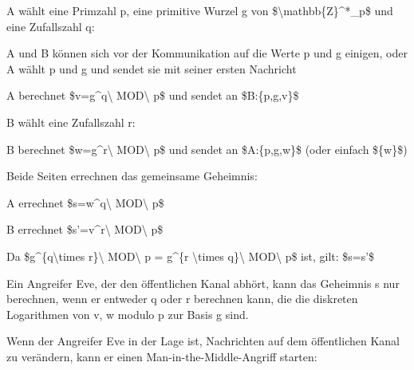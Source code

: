 \documentclass[a4paper]{article}
\begin{document}
\begin{multicols}{3}
\begin{itemize*}
            \begin{itemize*}
                  \item A wählt eine Primzahl p, eine primitive Wurzel g von \$\textbackslash mathbb\{Z\}\^{}*\_p\$ und eine Zufallszahl q:
                  \begin{itemize*} \item A und B können sich vor der Kommunikation auf die Werte p und g einigen, oder A wählt p und g und sendet sie mit seiner ersten Nachricht \item A berechnet \$v=g\^{}q\textbackslash{} MOD\textbackslash{} p\$ und sendet an \$B:\{p,g,v\}\$ \end{itemize*}
                  \item B wählt eine Zufallszahl r:
                  \begin{itemize*} \item B berechnet \$w=g\^{}r\textbackslash{} MOD\textbackslash{} p\$ und sendet an \$A:\{p,g,w\}\$ (oder einfach \$\{w\}\$) \end{itemize*}
                  \item Beide Seiten errechnen das gemeinsame Geheimnis:
                  \begin{itemize*} \item A errechnet \$s=w\^{}q\textbackslash{} MOD\textbackslash{} p\$ \item B errechnet \$s'=v\^{}r\textbackslash{} MOD\textbackslash{} p\$ \item Da \$g\^{}\{q\textbackslash times r\}\textbackslash{} MOD\textbackslash{} p = g\^{}\{r \textbackslash times q\}\textbackslash{} MOD\textbackslash{} p\$ ist, gilt: \$s=s'\$ \end{itemize*}
                  \item Ein Angreifer Eve, der den öffentlichen Kanal abhört, kann das Geheimnis s nur berechnen, wenn er entweder q oder r berechnen kann, die die diskreten Logarithmen von v, w modulo p zur Basis g sind.
            \end{itemize*}
            \item
            Wenn der Angreifer Eve in der Lage ist, Nachrichten auf dem
            öffentlichen Kanal zu verändern, kann er einen
            Man-in-the-Middle-Angriff starten:


\end{itemize*}
\end{multicols}
\end{document}
